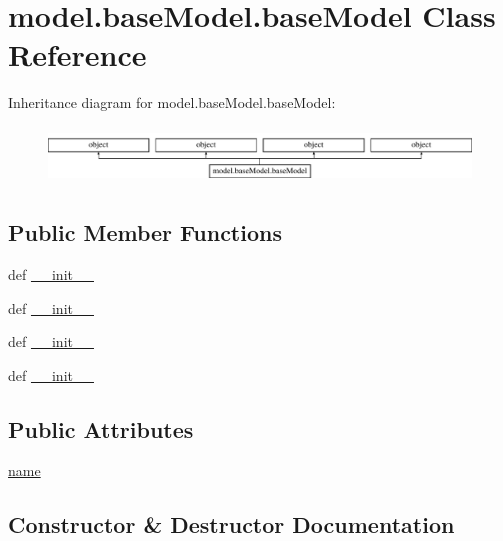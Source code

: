 \hypertarget{classmodel_1_1baseModel_1_1baseModel}{}\section{model.\+base\+Model.\+base\+Model Class Reference}
\label{classmodel_1_1baseModel_1_1baseModel}
Inheritance diagram for model.\+base\+Model.\+base\+Model\+:\begin{figure}[H]
\begin{center}
\leavevmode
\includegraphics[height=1.513514cm]{classmodel_1_1baseModel_1_1baseModel}
\end{center}
\end{figure}
\subsection*{Public Member Functions}
\begin{DoxyCompactItemize}
\item 
def \hyperlink{classmodel_1_1baseModel_1_1baseModel_ab8d48cf8c0c912c41512fa56fe899744}{\+\_\+\+\_\+init\+\_\+\+\_\+}
\item 
def \hyperlink{classmodel_1_1baseModel_1_1baseModel_ab8d48cf8c0c912c41512fa56fe899744}{\+\_\+\+\_\+init\+\_\+\+\_\+}
\item 
def \hyperlink{classmodel_1_1baseModel_1_1baseModel_ab8d48cf8c0c912c41512fa56fe899744}{\+\_\+\+\_\+init\+\_\+\+\_\+}
\item 
def \hyperlink{classmodel_1_1baseModel_1_1baseModel_ab8d48cf8c0c912c41512fa56fe899744}{\+\_\+\+\_\+init\+\_\+\+\_\+}
\end{DoxyCompactItemize}
\subsection*{Public Attributes}
\begin{DoxyCompactItemize}
\item 
\hyperlink{classmodel_1_1baseModel_1_1baseModel_aaeda64beafa1c2747373d6c4d5a3479f}{name}
\end{DoxyCompactItemize}


\subsection{Constructor \& Destructor Documentation}
\hypertarget{classmodel_1_1baseModel_1_1baseModel_ab8d48cf8c0c912c41512fa56fe899744}{}

